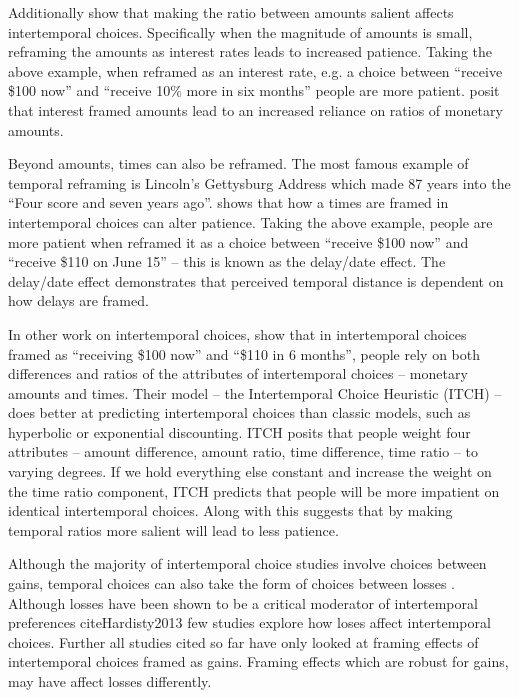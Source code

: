 \documentclass[]{article}
\begin{document}
Additionally  show that making the ratio between amounts salient affects intertemporal choices. 
Specifically when the magnitude of amounts is small, reframing the amounts as interest rates leads to increased patience. Taking the above example, when reframed as an interest rate, e.g.  a choice between  ``receive \$100 now'' and ``receive 10\% more in six months'' people are more patient.  posit that interest framed amounts lead to an increased reliance on ratios of monetary amounts.

Beyond amounts, times can also be reframed.
The most famous example of temporal reframing is  Lincoln's Gettysburg Address which made 87 years into the ``Four score and seven years ago''.
 shows that how a times are framed in intertemporal choices can alter patience. 
Taking the above example, people are more patient when reframed it as a choice between  ``receive \$100 now'' and ``receive \$110 on June 15'' -- this is known as the delay/date effect. 
The delay/date effect demonstrates that perceived temporal distance is dependent on how delays are framed. 

In other work on intertemporal choices,  show that in intertemporal choices framed as ``receiving \$100 now'' and ``\$110 in 6 months'', people rely on both differences and ratios of the  attributes of intertemporal choices -- monetary amounts and times.
Their model -- the Intertemporal Choice Heuristic (ITCH) -- does better at predicting intertemporal choices than classic models, such as hyperbolic or exponential discounting. 
ITCH posits that people weight four attributes -- amount difference, amount ratio, time difference, time ratio --  to varying degrees. 
If we hold everything else constant and increase the weight on the time ratio component, ITCH predicts that people will be more impatient on identical intertemporal choices. 
Along with  this suggests that by making temporal ratios more salient will lead to less patience.

%
% 
% 
Although the majority of intertemporal choice studies involve choices between gains, temporal choices can also take the form of choices between losses \cite{Hardisty2013, Hardisty2015}. 
Although losses have been shown to be a critical moderator of intertemporal preferences cite{Hardisty2013} few studies explore how loses affect intertemporal choices.
Further all studies cited so far have only looked at framing effects of intertemporal choices framed as gains. 
Framing effects which are robust for gains, may have affect losses differently.  
\end{document}
